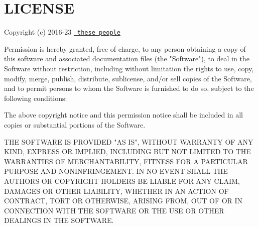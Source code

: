 \chapter{LICENSE}
\hypertarget{md_node__modules_2svelte_2_l_i_c_e_n_s_e}{}\label{md_node__modules_2svelte_2_l_i_c_e_n_s_e}
Copyright (c) 2016-\/23 \href{https://github.com/sveltejs/svelte/graphs/contributors}{\texttt{ these people}}

Permission is hereby granted, free of charge, to any person obtaining a copy of this software and associated documentation files (the "{}\+Software"{}), to deal in the Software without restriction, including without limitation the rights to use, copy, modify, merge, publish, distribute, sublicense, and/or sell copies of the Software, and to permit persons to whom the Software is furnished to do so, subject to the following conditions\+:

The above copyright notice and this permission notice shall be included in all copies or substantial portions of the Software.

THE SOFTWARE IS PROVIDED "{}\+AS IS"{}, WITHOUT WARRANTY OF ANY KIND, EXPRESS OR IMPLIED, INCLUDING BUT NOT LIMITED TO THE WARRANTIES OF MERCHANTABILITY, FITNESS FOR A PARTICULAR PURPOSE AND NONINFRINGEMENT. IN NO EVENT SHALL THE AUTHORS OR COPYRIGHT HOLDERS BE LIABLE FOR ANY CLAIM, DAMAGES OR OTHER LIABILITY, WHETHER IN AN ACTION OF CONTRACT, TORT OR OTHERWISE, ARISING FROM, OUT OF OR IN CONNECTION WITH THE SOFTWARE OR THE USE OR OTHER DEALINGS IN THE SOFTWARE. 